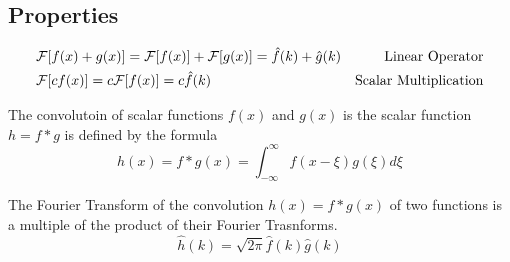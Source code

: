 \documentclass{report}
\begin{document}
   \subsection{Properties}
   \begin{align*}
	& \mathcal{F}[f(x) + g(x)] = \mathcal{F}[f(x)] + \mathcal{F}[g(x)] = \hat{f}(k) + \hat{g}(k) & \text{\quad Linear Operator}  \\
	& \mathcal{F}[cf(x)] = c\mathcal{F}[f(x)] = c \hat{f}(k) & \text{Scalar Multiplication}
   \end{align*}
   \begin{definition}[Convolution]
   The convolutoin of scalar functions $f(x)$ and $g(x)$ is the scalar function $h = f*g$ is defined by the formula	
   \[
      h(x) = f*g(x) = \int_{-\infty}^{\infty} f(x-\xi)g(\xi) d\xi
   \]
   \end{definition}
   \begin{theorem}
      The Fourier Transform of the convolution $h(x) = f*g(x)$ of two functions is a multiple of the product of their Fourier Trasnforms.
      \[
	 \hat{h}(k) = \sqrt{2\pi} \hat{f}(k) \hat{g}(k)
      \]
   	
   \end{theorem}
\end{document}
